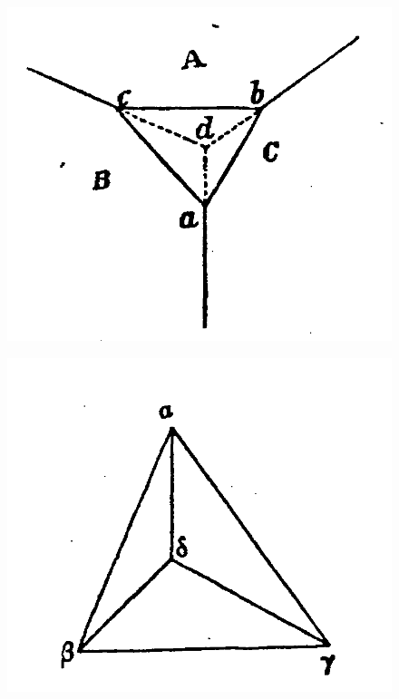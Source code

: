\documentclass[12pt]{article}
\begin{document}
\begin{figure}
\centering
\begin{minipage}{.3\textwidth}
  \centering
  \includegraphics[width=\linewidth]{fig_14}
  \label{fig_14}
\end{minipage}%
\begin{minipage}{.3\textwidth}
  \centering
  \includegraphics[width=\linewidth]{fig_15}
  \label{fig_15}
\end{minipage}

\end{figure}
\end{document}
